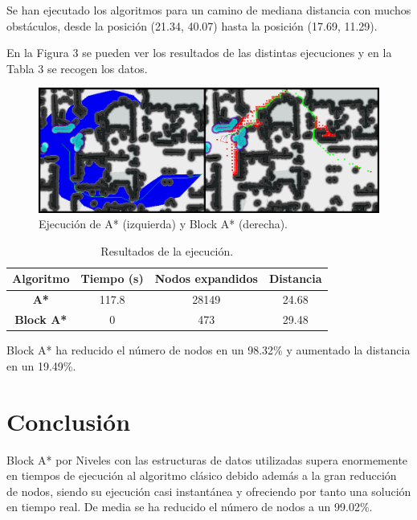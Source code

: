 \documentclass[11pt,spanish]{article} %
\begin{document}
Se han ejecutado los algoritmos para un camino de mediana distancia con muchos obstáculos, desde la posición (21.34, 40.07) hasta la posición (17.69, 11.29).

En la Figura 3 se pueden ver los resultados de las distintas ejecuciones y en la Tabla 3 se recogen los datos.

\begin{figure}[H]
  \begin{center}
  \includegraphics[scale=.26]{3_a}
  \caption{Ejecución de A* (izquierda) y Block A* (derecha).}
  \end{center}
\end{figure}

\begin{table}[H]
\begin{center}
 \begin{tabular}{|c|c|c|c|} 
 \hline
 \rule{0cm}{0.5cm}
 \textbf{Algoritmo} & \textbf{Tiempo (s)} & \textbf{Nodos expandidos} & \textbf{Distancia} \\
 \hline\hline
 \textbf{A*}       & 117.8 & 28149 & 24.68 \\ 
 \hline
 \textbf{Block A*} & 0 & 473 & 29.48 \\
 \hline
\end{tabular}
\caption{Resultados de la ejecución.}
\end{center}
\end{table}

Block A* ha reducido el número de nodos en un 98.32\% y aumentado la distancia en un 19.49\%.

\section{Conclusión}

Block A* por Niveles con las estructuras de datos utilizadas supera enormemente en tiempos de ejecución al algoritmo clásico debido además a la gran reducción de nodos, siendo su ejecución casi instantánea y ofreciendo por tanto una solución en tiempo real. De media se ha reducido el número de nodos a un 99.02\%.
\end{document}

